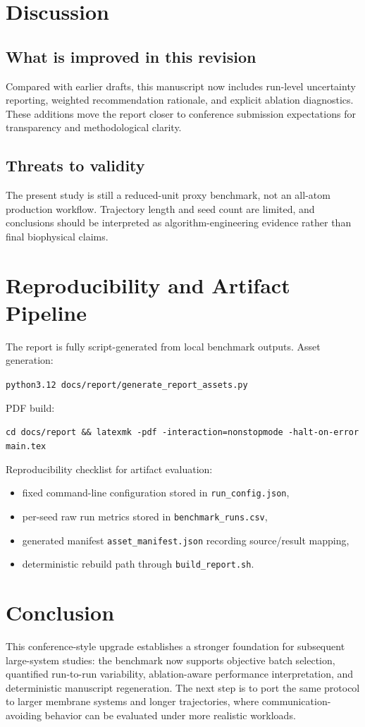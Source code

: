 \documentclass[conference]{IEEEtran}
\begin{document}
\section{Discussion}
\subsection{What is improved in this revision}
Compared with earlier drafts, this manuscript now includes
run-level uncertainty reporting, weighted recommendation rationale,
and explicit ablation diagnostics.
These additions move the report closer to conference submission expectations
for transparency and methodological clarity.

\subsection{Threats to validity}
The present study is still a reduced-unit proxy benchmark, not an all-atom production workflow.
Trajectory length and seed count are limited, and conclusions should be interpreted as
algorithm-engineering evidence rather than final biophysical claims.

\section{Reproducibility and Artifact Pipeline}
The report is fully script-generated from local benchmark outputs.
Asset generation:
\begin{center}
\texttt{python3.12 docs/report/generate\_report\_assets.py}
\end{center}
PDF build:
\begin{center}
\texttt{cd docs/report \&\& latexmk -pdf -interaction=nonstopmode -halt-on-error main.tex}
\end{center}

Reproducibility checklist for artifact evaluation:
\begin{itemize}
\item fixed command-line configuration stored in \texttt{run\_config.json},
\item per-seed raw run metrics stored in \texttt{benchmark\_runs.csv},
\item generated manifest \texttt{asset\_manifest.json} recording source/result mapping,
\item deterministic rebuild path through \texttt{build\_report.sh}.
\end{itemize}

\section{Conclusion}
This conference-style upgrade establishes a stronger foundation for subsequent large-system studies:
the benchmark now supports objective batch selection,
quantified run-to-run variability,
ablation-aware performance interpretation,
and deterministic manuscript regeneration.
The next step is to port the same protocol to larger membrane systems and longer trajectories,
where communication-avoiding behavior can be evaluated under more realistic workloads.
\end{document}
